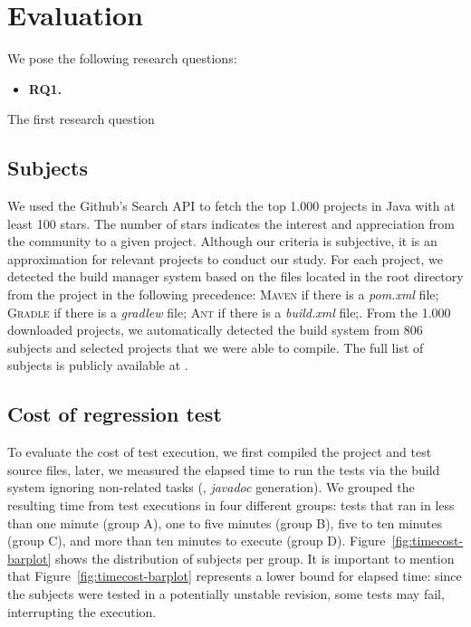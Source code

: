 \section{Evaluation}

We pose the following research questions:

\newcommand{\RQONE}{\textbf{RQ1.}}
\newcommand{\rqOne}{\RQONE{}~}

\begin{itemize}
    \item \rqOne
\end{itemize}

The first research question 

\subsection{Subjects}
\label{sec:subjects}

We used the Github's Search API to fetch the top 1.000 projects in
Java with at least 100 stars. The number of stars indicates the
interest and appreciation from the community to a given project.
 Although our
criteria is subjective, it is an approximation for relevant projects
to conduct our study. For each project, we detected the build manager
system based on the files located in the root directory from the
project in the following precedence: \textsc{Maven} if there is a
\emph{pom.xml} file; \textsc{Gradle} if there is a \emph{gradlew}
file; \textsc{Ant} if there is a \emph{build.xml} file;. From the
1.000 downloaded projects, we automatically detected the build system
from 806 subjects and selected  projects that we were able to
compile.  The full list of subjects is publicly available at
.

\subsection{Cost of regression test}
\label{sec:timecost}

To evaluate the cost of test execution, we first compiled the project
and test source files, later, we measured the elapsed time to run the
tests via the build system ignoring non-related tasks (\eg,
\emph{javadoc} generation).  We grouped the resulting time from test
executions in four different groups: tests that ran in less than one
minute (group A), one to five minutes (group B), five to ten minutes
(group C), and more than ten minutes to execute (group D).
Figure~\ref{fig:timecost-barplot} shows the distribution of subjects
per group. It is important to mention that
Figure~\ref{fig:timecost-barplot} represents a lower bound for elapsed
time: since the subjects were tested in a potentially unstable
revision, some tests may fail, interrupting the execution.

